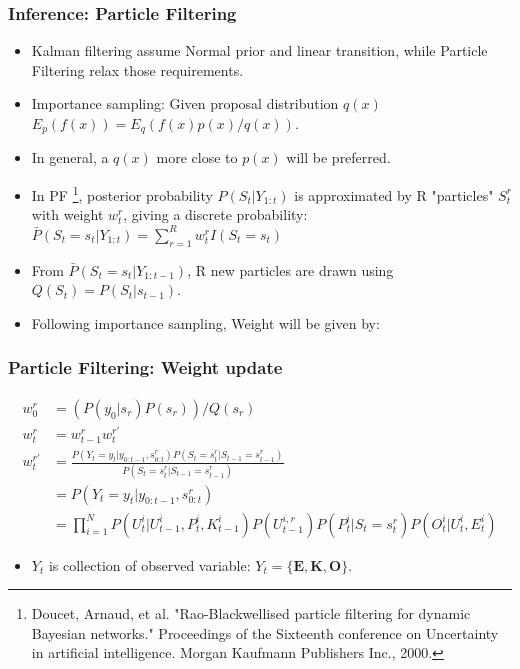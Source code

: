 \documentclass{beamer}
\begin{document}
\begin{frame}
    \frametitle{Inference: Particle Filtering}

    \begin{itemize}
        \item Kalman filtering assume Normal prior and linear transition, while Particle Filtering relax those requirements.
        \item Importance sampling: Given proposal distribution $q(x)$ $E_p(f(x)) = E_q(f(x)p(x)/q(x))$. 
        \item In general, a $q(x)$ more close to $p(x)$ will be preferred. 
        \item In PF
            \footnote{Doucet, Arnaud, et al. "Rao-Blackwellised particle filtering for dynamic Bayesian networks." Proceedings of the Sixteenth conference on Uncertainty in artificial intelligence. Morgan Kaufmann Publishers Inc., 2000.},
            posterior probability $P(S_t|Y_{1:t})$ is approximated by R "particles" $S_t^r$ with weight $w_t^r$, giving a discrete probability: $\bar{P}(S_t = s_t|Y_{1:t}) = \sum_{r=1}^R w_t^r I(S_t = s_t)$
        \item From $\bar{P}(S_t = s_t|Y_{1:t-1})$, R new particles are drawn using $Q(S_t) = P(S_t|s_{t-1})$. 
        \item Following importance sampling, Weight will be given by:
    \end{itemize}
\end{frame}

\begin{frame}
    \frametitle{Particle Filtering: Weight update}

    \begin{align*}
        w_0^r &= (P(y_0|s_r)P(s_r))/Q(s_r) \\
        w_t^r &= w_{t-1}^r w_t^{r'} \\
        w_t^{r'} &= \frac{P(Y_t = y_t|y_{0:t-1}, s_{0:t}^r)P(S_t=s_t^r|S_{t-1}=s_{t-1}^r)}{P(S_t=s_t^r|S_{t-1}=s_{t-1}^r)} \\
            &= P(Y_t=y_t|y_{0:t-1},s_{0:t}^r) \\
            &= \prod_{i=1}^N P(U_t^i|U_{t-1}^i,P_t^i,K_{t-1}^i)P(U_{t-1}^{i,r}) P(P_t^i|S_t=s_t^r)P(O_t^i|U_t^i,E_t^i)
    \end{align*}

    \begin{itemize}
        \item $Y_t$ is collection of observed variable: $Y_t = \{ \mathbf{E}, \mathbf{K}, \mathbf{O} \} $.
    \end{itemize}

\end{frame}
\end{document}
